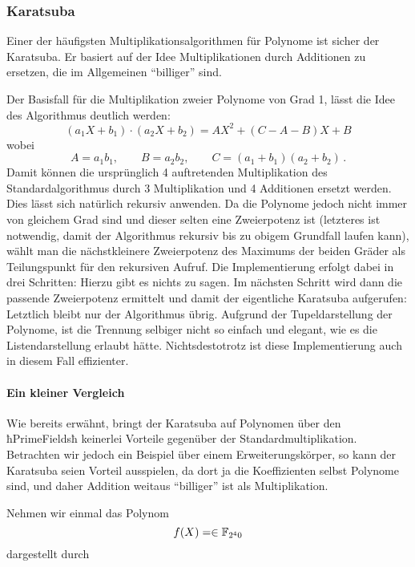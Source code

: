\subsubsection{Karatsuba}
Einer der häufigsten Multiplikationsalgorithmen für Polynome ist sicher der
Karatsuba. Er basiert auf der Idee Multiplikationen durch Additionen zu
ersetzen, die im Allgemeinen "`billiger"' sind. 

Der Basisfall für die Multiplikation zweier Polynome von Grad 1, lässt die Idee
des Algorithmus deutlich werden:
\[ (a_1 X + b_1) \cdot (a_2 X + b_2) = 
  A X^2 + (C - A - B) X + B\]
wobei 
\[ A = a_1 b_1, \qquad B = a_2b_2, \qquad C = (a_1+b_1)(a_2+b_2) \,.\]
Damit können die ursprünglich 4 auftretenden Multiplikation des
Standardalgorithmus durch 3 Multiplikation und 4 Additionen ersetzt werden.
Dies lässt sich natürlich rekursiv anwenden. Da die Polynome jedoch nicht immer
von gleichem Grad sind und dieser selten eine Zweierpotenz ist (letzteres ist
notwendig, damit der Algorithmus rekursiv bis zu obigem Grundfall laufen kann),
wählt man die nächstkleinere Zweierpotenz des Maximums der beiden Gräder als
Teilungspunkt für den rekursiven Aufruf.
Die Implementierung erfolgt dabei in drei Schritten: 
Hierzu gibt es nichts zu sagen. Im nächsten Schritt wird dann die passende
Zweierpotenz ermittelt und damit der eigentliche Karatsuba aufgerufen:
Letztlich bleibt nur der Algorithmus übrig. Aufgrund der Tupeldarstellung der
Polynome, ist die Trennung selbiger nicht so einfach und elegant, wie es die
Listendarstellung erlaubt hätte. Nichtsdestotrotz ist diese Implementierung
auch in diesem Fall effizienter.

\paragraph{Ein kleiner Vergleich}
Wie bereits erwähnt, bringt der Karatsuba auf Polynomen über den ħPrimeFieldsħ
keinerlei Vorteile gegenüber der Standardmultiplikation. Betrachten wir jedoch
ein Beispiel über einem Erweiterungskörper, so kann der Karatsuba seien Vorteil
ausspielen, da dort ja die Koeffizienten selbst Polynome sind, und daher
Addition weitaus "`billiger"' ist als Multiplikation.
\begin{beispiel}
  Nehmen wir einmal das Polynom 
  \[ f(X) = \in \mathbb{F}_{2^40}\]
  dargestellt durch
\end{beispiel}

